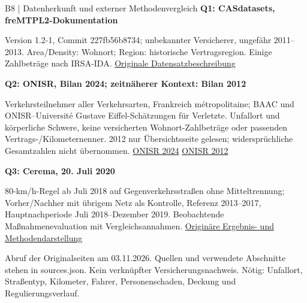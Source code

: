 \documentclass[aspectratio=169,11pt]{beamer}
\newcommand{\source}[1]{\vfill{\fontsize{6.5}{7.4}\selectfont\color{muted}#1\par}}
\newcommand{\smalltext}{\fontsize{9}{11.3}\selectfont}
\begin{document}
\begin{frame}[t]{B8 | Datenherkunft und externer Methodenvergleich}
\smalltext
\textbf{Q1: CASdatasets, freMTPL2-Dokumentation}\par
Version 1.2-1, Commit 227fb56b8734; unbekannter Versicherer, ungefähr 2011--2013.
Area/Density: Wohnort; Region: historische Vertragsregion. Einige Zahlbeträge nach IRSA-IDA.
\href{https://github.com/dutangc/CASdatasets/blob/227fb56b8734bdb7c0327a41180e01d2ddaeaf26/man/freMTPL.Rd}{Originale Datensatzbeschreibung}\par\medskip
\textbf{Q2: ONISR, Bilan 2024; zeitnäherer Kontext: Bilan 2012}\par
Verkehrsteilnehmer aller Verkehrsarten, Frankreich métropolitaine; BAAC und
ONISR--Université Gustave Eiffel-Schätzungen für Verletzte.
Unfallort und körperliche Schwere, keine versicherten Wohnort-Zahlbeträge oder passenden Vertrags-/Kilometernenner.
2012 nur Übersichtsseite gelesen; widersprüchliche Gesamtzahlen nicht übernommen.
\href{https://www.onisr.securite-routiere.gouv.fr/etat-de-linsecurite-routiere/bilans-annuels-de-la-securite-routiere/bilan-2024-de-la-securite-routiere}{ONISR 2024}
\quad\href{https://www.onisr.securite-routiere.gouv.fr/etat-de-l-insecurite-routiere/bilans-annuels-de-la-securite-routiere/bilan-2012-de-la-securite-routiere}{ONISR 2012}\par\medskip
\textbf{Q3: Cerema, 20. Juli 2020}\par
80-km/h-Regel ab Juli 2018 auf Gegenverkehrsstraßen ohne Mitteltrennung;
Vorher/Nachher mit übrigem Netz als Kontrolle, Referenz 2013--2017,
Hauptnachperiode Juli 2018--Dezember 2019. Beobachtende Maßnahmenevaluation mit Vergleichsannahmen.
\href{https://www.cerema.fr/en/actualites/lowering-maximum-authorised-speed-80-kmh-final-assessment}{Originäre Ergebnis- und Methodendarstellung}
\source{Abruf der Originalseiten am 03.11.2026. Quellen und verwendete Abschnitte stehen in sources.json.
Kein verknüpfter Versicherungsnachweis. Nötig: Unfallort, Straßentyp, Kilometer, Fahrer, Personenschaden, Deckung und Regulierungsverlauf.}
\end{frame}
\end{document}
